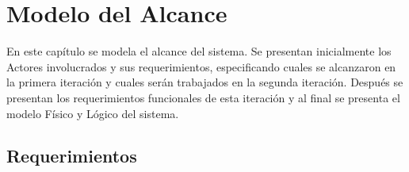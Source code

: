 \chapter{Modelo del Alcance}
\label{cap:reqUsr}

	En este capítulo se modela el alcance del sistema. Se presentan inicialmente los Actores involucrados y sus requerimientos, especificando cuales se alcanzaron en la primera iteración y cuales serán trabajados en la segunda iteración. Después se presentan los requerimientos funcionales de esta iteración y al final se presenta el modelo Físico y Lógico del sistema.




\section{Requerimientos}

